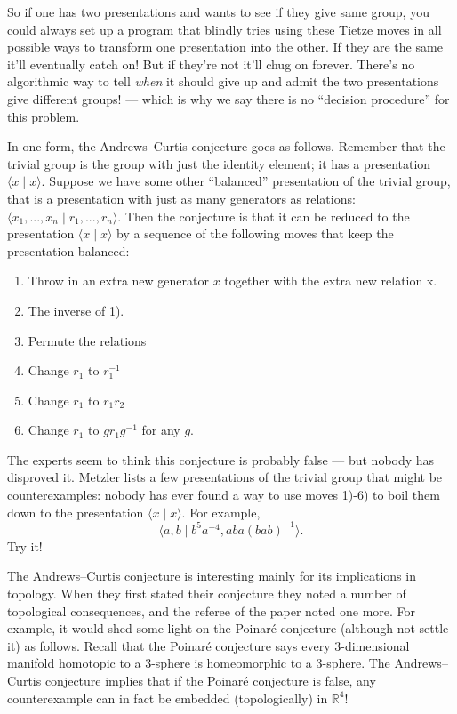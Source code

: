 \documentclass[12pt]{article}
\def\tightlist{}
\begin{document}
So if one has two presentations and wants to see if they give same
group, you could always set up a program that blindly tries using these
Tietze moves in all possible ways to transform one presentation into the
other. If they are the same it'll eventually catch on! But if they're
not it'll chug on forever. There's no algorithmic way to tell
\emph{when} it should give up and admit the two presentations give
different groups! --- which is why we say there is no ``decision
procedure'' for this problem.

In one form, the Andrews--Curtis conjecture goes as follows. Remember
that the trivial group is the group with just the identity element; it
has a presentation \(\langle x \mid x \rangle\). Suppose we have some
other ``balanced'' presentation of the trivial group, that is a
presentation with just as many generators as relations:
\(\langle x_1,...,x_n \mid r_1,...,r_n \rangle\). Then the conjecture is
that it can be reduced to the presentation \(\langle x \mid x \rangle\)
by a sequence of the following moves that keep the presentation
balanced:

\begin{enumerate}
\def\labelenumi{\arabic{enumi})}
\tightlist
\item
  Throw in an extra new generator \(x\) together with the extra new
  relation x.
\item
  The inverse of 1).
\item
  Permute the relations
\item
  Change \(r_1\) to \(r_1^{-1}\)
\item
  Change \(r_1\) to \(r_1r_2\)
\item
  Change \(r_1\) to \(gr_1g^{-1}\) for any \(g\).
\end{enumerate}

The experts seem to think this conjecture is probably false --- but
nobody has disproved it. Metzler lists a few presentations of the
trivial group that might be counterexamples: nobody has ever found a way
to use moves 1)-6) to boil them down to the presentation
\(\langle x \mid x \rangle\). For example,
\[\langle a, b \mid b^5a^{-4}, aba(bab)^{-1}\rangle.\] Try it!

The Andrews--Curtis conjecture is interesting mainly for its implications
in topology. When they first stated their conjecture they noted a number
of topological consequences, and the referee of the paper noted one
more. For example, it would shed some light on the Poinar\'e conjecture
(although not settle it) as follows. Recall that the Poinar\'e conjecture
says every \(3\)-dimensional manifold homotopic to a 3-sphere is
homeomorphic to a 3-sphere. The Andrews--Curtis conjecture implies that
if the Poinar\'e conjecture is false, any counterexample can in fact be
embedded (topologically) in \(\mathbb{R}^4\)!
\end{document}
